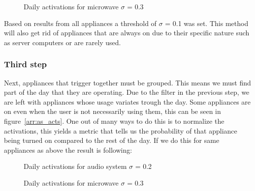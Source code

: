 \begin{figure}[H]
    \centering
    \caption{Daily activations for microwave $\sigma$ = 0.3}
    \label{arr:microwave_acts}
\end{figure}

Based on results from all appliances a threshold of $\sigma$ = 0.1 was set.
This method will also get rid of appliances that are always on due to their specific nature such as server computers 
or are rarely used. 

\subsubsection{Third step}

Next, appliances that trigger together must be grouped. 
This means we must find part of the day that they are operating.
Due to the filter in the previous step, we are left with appliances whose usage variates trough the day. 
Some appliances are on even when the user is not necessarily using them, this can be seen in figure \ref{arr:as_acts}.
One out of many ways to do this is to normalize the activations, this yields a metric that tells us the probability of that appliance being turned on compared to the rest of the day. 
If we do this for same appliances as above the result is following: 

\begin{figure}[H]
    \centering
    \caption{Daily activations for audio system $\sigma$ = 0.2}
    \label{arr:as_acts_norm}
\end{figure}

\begin{figure}[H]
    \centering
    \caption{Daily activations for microwave $\sigma$ = 0.3}
    \label{arr:microwave_acts_norm}
\end{figure}

